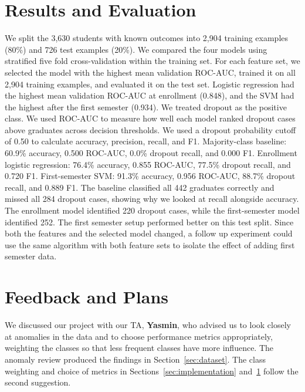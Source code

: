 \documentclass[11pt]{article}
\begin{document}
\section{Results and Evaluation}\label{sec:results}

We split the 3,630 students with known outcomes into 2,904 training examples (80\%) and 726 test examples (20\%). We compared the four models using stratified five fold cross-validation within the training set. For each feature set, we selected the model with the highest mean validation ROC-AUC, trained it on all 2,904 training examples, and evaluated it on the test set. Logistic regression had the highest mean validation ROC-AUC at enrollment (0.848), and the SVM had the highest after the first semester (0.934).
We treated dropout as the positive class. We used ROC-AUC to measure how well each model ranked dropout cases above graduates across decision thresholds. We used a dropout probability cutoff of 0.50 to calculate accuracy, precision, recall, and F1.
Majority-class baseline: 60.9\% accuracy, 0.500 ROC-AUC, 0.0\% dropout recall, and 0.000 F1.
Enrollment logistic regression: 76.4\% accuracy, 0.855 ROC-AUC, 77.5\% dropout recall, and 0.720 F1.
First-semester SVM: 91.3\% accuracy, 0.956 ROC-AUC, 88.7\% dropout recall, and 0.889 F1.
The baseline classified all 442 graduates correctly and missed all 284 dropout cases, showing why we looked at recall alongside accuracy. The enrollment model identified 220 dropout cases, while the first-semester model identified 252. The first semester setup performed better on this test split. Since both the features and the selected model changed, a follow up experiment could use the same algorithm with both feature sets to isolate the effect of adding first semester data.

\section{Feedback and Plans}\label{sec:feedback}

We discussed our project with our TA, \textbf{Yasmin}, who advised us to look closely at anomalies in the data and to choose performance metrics appropriately, weighting the classes so that less frequent classes have more influence.
The anomaly review produced the findings in Section~\ref{sec:dataset}.
The class weighting and choice of metrics in Sections~\ref{sec:implementation} and~\ref{sec:results} follow the second suggestion.
\end{document}
